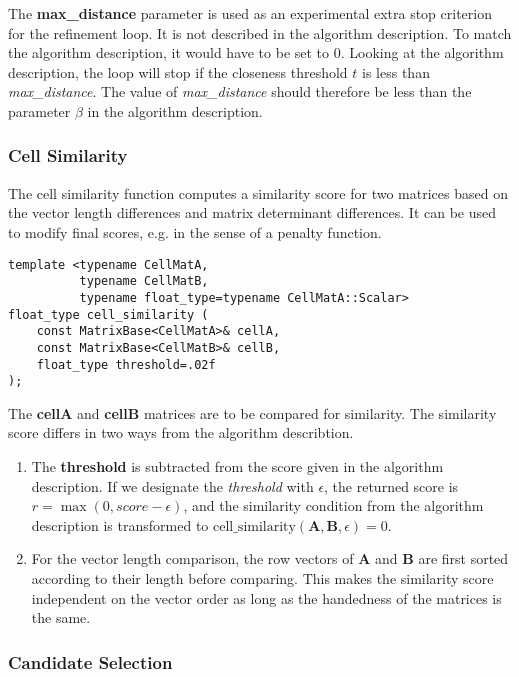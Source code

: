 \documentclass[a4paper,10pt]{article}
\newcommand{\mat}[1]{\mathbf{#1}}
\begin{document}
The \textbf{max\_distance} parameter is used as an experimental extra stop criterion for the refinement loop. It is not described in the algorithm description. To match the algorithm description, it would have to be set to $0$. Looking at the algorithm description, the loop will stop if the closeness threshold $t$ is less than \emph{max\_distance}. The value of \emph{max\_distance} should therefore be less than the parameter $\beta$ in the algorithm description.

\subsubsection{Cell Similarity}

The cell similarity function computes a similarity score for two matrices based on the vector length differences and matrix determinant differences. It can be used to modify final scores, e.g. in the sense of a penalty function.

\begin{lstlisting}
template <typename CellMatA,
          typename CellMatB,
          typename float_type=typename CellMatA::Scalar>
float_type cell_similarity (
    const MatrixBase<CellMatA>& cellA,
    const MatrixBase<CellMatB>& cellB,
    float_type threshold=.02f
);
\end{lstlisting}

The \textbf{cellA} and \textbf{cellB} matrices are to be compared for similarity. The similarity score differs in two ways from the algorithm describtion.
%
\begin{enumerate}
 \item The \textbf{threshold} is subtracted from the score given in the algorithm description. If we designate the \emph{threshold} with $\epsilon$, the returned score is $r = \max(0, score - \epsilon)$, and the similarity condition from the algorithm description is transformed to $\text{cell\_similarity}(\mat{A},\mat{B},\epsilon) = 0$.
 \item For the vector length comparison, the row vectors of $\mat{A}$ and $\mat{B}$ are first sorted according to their length before comparing. This makes the similarity score independent on the vector order as long as the handedness of the matrices is the same.
\end{enumerate}

\subsubsection{Candidate Selection}
\end{document}
